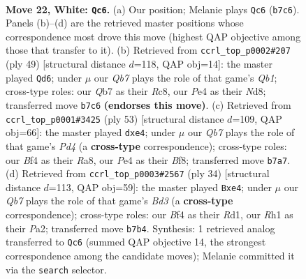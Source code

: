 \documentclass[11pt]{article}
\begin{document}
\clearpage

\begin{figure}[p]\centering
\begin{subfigure}{0.46\textwidth}\centering
\resizebox{\linewidth}{!}{%
\newchessgame
\chessboard[
  setfen={r2q1b2/1Q1nkpr1/3p1np1/2pP2N1/4PB2/1PN5/P2K4/5R1R w - - 7 22},
  showmover=false,
  pgfstyle=straightmove, color=movearrow, markmove={b7-c6}
]}
\caption{}
\end{subfigure}\hfill
\begin{subfigure}{0.46\textwidth}\centering
\resizebox{\linewidth}{!}{%
\newchessgame
\chessboard[
  setfen={1qrnk2r/p3n2p/4pp2/1PN2p2/N2P1P2/PQ2p1P1/6BP/5RK1 b k - 0 25},
  showmover=false,
  pgfstyle=straightmove, color=movearrow, markmove={b8-d6}
]}
\caption{}
\end{subfigure}
\\[4pt]
\begin{subfigure}{0.46\textwidth}\centering
\resizebox{\linewidth}{!}{%
\newchessgame
\chessboard[
  setfen={r4bk1/3n1p2/r1p4p/2Ppq1p1/1P1NN3/7P/2Q2BP1/1R2R1K1 b - - 0 27},
  showmover=false,
  pgfstyle=straightmove, color=movearrow, markmove={d5-e4}
]}
\caption{}
\end{subfigure}\hfill
\begin{subfigure}{0.46\textwidth}\centering
\resizebox{\linewidth}{!}{%
\newchessgame
\chessboard[
  setfen={r1q1kr2/1b1n1pQp/pp2p3/1N4P1/4n3/3B1N2/PP3P1P/3RK2R w Kq - 1 18},
  showmover=false,
  pgfstyle=straightmove, color=movearrow, markmove={d3-e4}
]}
\caption{}
\end{subfigure}
\caption{\textbf{Move 22, White: \texttt{Qc6}.} (a) Our position; Melanie plays \texttt{Qc6} (\texttt{b7c6}). Panels (b)--(d) are the retrieved master positions whose correspondence most drove this move (highest QAP objective among those that transfer to it). (b) Retrieved from \texttt{ccrl\_top\_p0002\#207} (ply 49) [structural distance $d$=118, QAP obj=14]: the master played \texttt{Qd6}; under $\mu$ our \emph{Qb7} plays the role of that game's \emph{Qb1}; cross-type roles: our \emph{Q}b7 as their \emph{R}c8, our \emph{P}e4 as their \emph{N}d8; transferred move \texttt{b7c6} \textbf{(endorses this move)}. (c) Retrieved from \texttt{ccrl\_top\_p0001\#3425} (ply 53) [structural distance $d$=109, QAP obj=66]: the master played \texttt{dxe4}; under $\mu$ our \emph{Qb7} plays the role of that game's \emph{Pd4} (a \textbf{cross-type} correspondence); cross-type roles: our \emph{B}f4 as their \emph{R}a8, our \emph{P}e4 as their \emph{B}f8; transferred move \texttt{b7a7}. (d) Retrieved from \texttt{ccrl\_top\_p0003\#2567} (ply 34) [structural distance $d$=113, QAP obj=59]: the master played \texttt{Bxe4}; under $\mu$ our \emph{Qb7} plays the role of that game's \emph{Bd3} (a \textbf{cross-type} correspondence); cross-type roles: our \emph{B}f4 as their \emph{R}d1, our \emph{R}h1 as their \emph{P}a2; transferred move \texttt{b7b4}. Synthesis: 1 retrieved analog transferred to \texttt{Qc6} (summed QAP objective 14, the strongest correspondence among the candidate moves); Melanie committed it via the \texttt{search} selector.}
\label{fig:thought-m42}
\end{figure}
\end{document}
